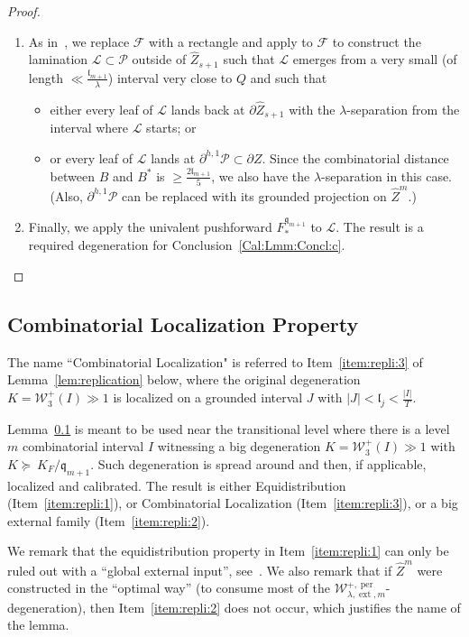 \documentclass{amsart}
\newcommand{\1}{{\mathbb 1 }}
\newcommand{\ext}{{\operatorname{ext}}}
\newcommand{\Width}{{\mathcal W}}
\newcommand{\wZ}{{\widehat Z}}
\newcommand{\qq}{\mathfrak{q}}
\newcommand{\length}{{\mathfrak l}}
\newcommand\per{{\operatorname{per}}}
\theoremstyle{remark}
\numberwithin{equation}{section}
\theoremstyle{definition}
\begin{document}
\begin{proof}
\begin{enumerate}[label=\text{(\arabic*)},font=\normalfont,leftmargin=*,start=19]
   \item As in~\cite[proof after Claim 6 in \S~9]{DL22}, we replace $\mathcal F$ with a rectangle and apply \cite[Lemma 6.9]{DL22} to $\mathcal F$ to construct the lamination $\mathcal L \subset \mathcal P$ outside of $\wZ_{s+1}$ such that $\mathcal L$ emerges from a very small (of length $\ll \frac{\length_{m+1}}{\lambda}$) interval very close to $Q$ and such that 
   \begin{itemize}
   \item either every leaf of $\mathcal{L}$ lands back at $\partial \wZ_{s+1}$ with the $\lambda$-separation from the interval where $\mathcal L$ starts; or
   \item or every leaf of $\mathcal{L}$ lands at $\partial^{h,1}\mathcal P\subset \partial Z$. Since the combinatorial distance between $B$ and $B^*$ is $\ge \frac{2\length_{m+1}}{5}$, we also have the $\lambda$-separation in this case. (Also, $\partial^{h,1}\mathcal P$ can be replaced with its grounded projection on $\wZ^{m}$.)
   \end{itemize}
    \item Finally, we apply the univalent pushforward $F^{\qq_{m+1}}_*$ to $\mathcal L$. The result is a required degeneration for Conclusion~\ref{Cal:Lmm:Concl:c}.
\end{enumerate}
\end{proof}

\subsection{Combinatorial Localization Property} \label{ss:comblocal} 
The name ``Combinatorial Localization" is referred to Item~\ref{item:repli:3} of Lemma~\ref{lem:replication} below, where the original degeneration $K=\Width_3^+(I) \gg 1 $ is localized on a grounded interval $J$ with $|J|<\length_{j}<\frac{|I|
}{T}$. 


Lemma~\ref{ss:comblocal} is meant to be used near the transitional level where there is a level $m$ combinatorial interval $I$ witnessing a big degeneration $K=\Width_3^+(I)\gg 1$ with $K\succeq \ K_F/\qq_{m+1}$. Such degeneration is spread around and then, if applicable, localized and calibrated. The result is either Equidistribution (Item~\ref{item:repli:1}), or Combinatorial Localization (Item~\ref{item:repli:3}), or a big external family (Item~\ref{item:repli:2}).



We remark that the equidistribution property in Item~\ref{item:repli:1} can only be ruled out with a ``global external input'', see~\cite{DL:HypComp}. We also remark that if $\wZ^m$ were constructed in the ``optimal way'' (to consume most of the $\Width^{+,\per}_{\lambda, \ext, m}$-degeneration), then Item~\ref{item:repli:2} does not occur, which justifies the name of the lemma. 
\end{document}
